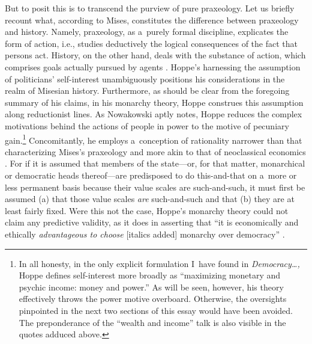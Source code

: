 But to posit this is to transcend the purview of pure praxeology. Let us briefly recount what, according to Mises, constitutes the difference between praxeology and history. Namely, praxeology, as a~purely formal discipline, explicates the form of action, i.e., studies deductively the logical consequences of the fact that persons act. History, on the other hand, deals with the substance of action, which comprises goals actually pursued by agents 
\parencite[][p.271]{mises_theory_2007}. %
 Hoppe's harnessing the assumption of politicians' self-interest unambiguously positions his considerations in the realm of Misesian history. Furthermore, as should be clear from the foregoing summary of his claims, in his monarchy theory, Hoppe construes this assumption along reductionist lines. As Nowakowski 
\parencite*[][p.272]{nowakowski_dlaczego_2010} %
 aptly notes, Hoppe reduces the complex motivations behind the actions of people in power to the motive of pecuniary gain.\footnote{In all honesty, in the only explicit formulation I~have found in \textit{Democracy…,} Hoppe 
\parencite*[][p.144]{hoppe_democracy_2007} %
 defines self-interest more broadly as ``maximizing monetary and psychic income: money and power.'' As will be seen, however, his theory effectively throws the power motive overboard. Otherwise, the oversights pinpointed in the next two sections of this essay would have been avoided. The preponderance of the ``wealth and income'' talk is also visible in the quotes adduced above. } Concomitantly, he employs a~conception of rationality narrower than that characterizing Mises's praxeology and more akin to that of neoclassical economics 
\parencites[see][]{long_realism_2006}[][]{coyne_problem_2015}. %
 For if it is assumed that members of the state---or, for that matter, monarchical or democratic heads thereof---are predisposed to do this-and-that on a~more or less permanent basis because their value scales are such-and-such, it must first be assumed (a) that those value scales \textit{are} such-and-such and that (b) they are at least fairly fixed. Were this not the case, Hoppe's monarchy theory could not claim any predictive validity, as it does in asserting that ``it is economically and ethically \textit{advantageous to choose} [italics added] monarchy over democracy'' 
\parencite[][p.xx]{hoppe_democracy_2007}.%
